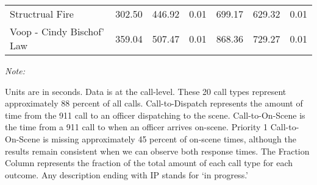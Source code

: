 \begin{table}
\begin{threeparttable}
\begin{tabular}[t]{lllllll}
Structrual Fire & 302.50 & 446.92 & 0.01 & 699.17 & 629.32 & 0.01\\
Voop - Cindy Bischof' Law & 359.04 & 507.47 & 0.01 & 868.36 & 729.27 & 0.01\\
\bottomrule
\end{tabular}
\begin{tablenotes}
\item \textit{Note: } 
\item Units are in seconds. Data is at         the call-level. These 20 call types represent approximately 88 percent of all calls.         Call-to-Dispatch represents          the amount of time from the 911 call to an officer dispatching         to the scene. Call-to-On-Scene is the time from a 911 call to         when an officer arrives on-scene.         Priority 1 Call-to-On-Scene is missing approximately 45 percent         of on-scene times, although the results         remain consistent when we can observe both response times. The Fraction         Column         represents the fraction of the total amount of each call type for each outcome. Any description         ending with IP stands for `in progress.'                  
\end{tablenotes}
\end{threeparttable}
\end{table}

